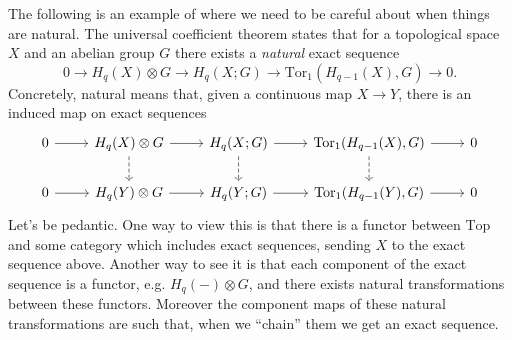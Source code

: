 \documentclass[12pt]{article}
\begin{document}
\begin{example}
	The following is an example of where we need to be careful about when things are natural. The universal coefficient theorem states that for a topological space $X$ and an abelian group $G$ there exists a \textit{natural} exact sequence
	\begin{equation*}
		0 \to H_q(X)\otimes G \to H_q(X; G) \to \text{Tor}_1(H_{q-1}(X), G) \to 0.
	\end{equation*}
	Concretely, natural means that, given a continuous map $X\to Y$, there is an induced map on exact sequences 
	\begin{equation*}
\begin{tikzcd}
0 \arrow[r] & H_q(X)\otimes G \arrow[r] \arrow[d, dashed] & H_q(X;G) \arrow[r] \arrow[d, dashed] & {\text{Tor}_1(H_{q-1}(X), G)} \arrow[r] \arrow[d, dashed] & 0 \\
0 \arrow[r] & H_q(Y)\otimes G \arrow[r]                   & H_q(Y;G) \arrow[r]                   & {\text{Tor}_1(H_{q-1}(Y), G)} \arrow[r]                   & 0
\end{tikzcd}
	\end{equation*}
	Let's be pedantic. One way to view this is that there is a functor between $\text{Top}$ and some category which includes exact sequences, sending $X$ to the exact sequence above. Another way to see it is that each component of the exact sequence is a functor, e.g. $H_q(-)\otimes G$, and there exists natural transformations between these functors. Moreover the component maps of these natural transformations are such that, when we ``chain'' them we get an exact sequence.


\end{example}
\end{document}
